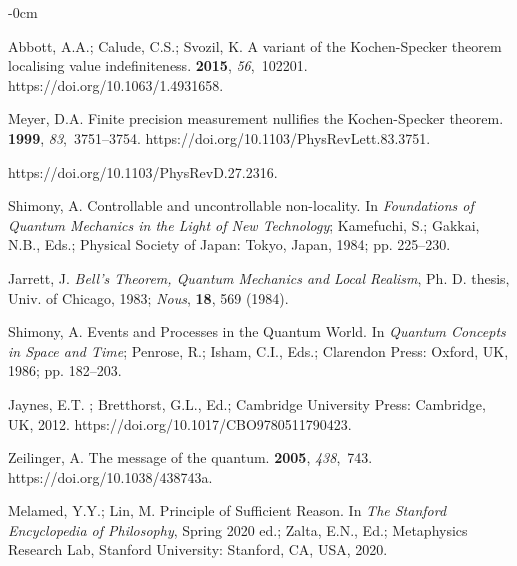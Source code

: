 \documentclass[entropy,article,accept,oneauthor,pdftex]{Definitions/mdpi}
\begin{document}
\begin{adjustwidth}{-\extralength}{0cm}
\begin{thebibliography}{999}
Abbott, A.A.; Calude, C.S.; Svozil, K.
\newblock A variant of the {K}ochen-{S}pecker theorem localising value
  indefiniteness.
 {\bf 2015}, {\em
  56},~102201.
\newblock
  {https://doi.org/10.1063/1.4931658}.

Meyer, D.A.
\newblock Finite precision measurement nullifies the {K}ochen-{S}pecker
  theorem.
 {\bf 1999}, {\em 83},~3751--3754.
\newblock
  {https://doi.org/10.1103/PhysRevLett.83.3751}.

\newblock {}
\newblock {}
\newblock
  {https://doi.org/10.1103/PhysRevD.27.2316}.

Shimony, A.
\newblock Controllable and uncontrollable non-locality.
\newblock  In \emph{Foundations of Quantum Mechanics in the Light of New Technology}; Kamefuchi, S.; Gakkai, N.B., Eds.; Physical Society of Japan:
  Tokyo, Japan, 1984; pp. 225--230.


Jarrett, J.
\newblock
 {\sl Bell's Theorem, Quantum Mechanics and Local
  Realism}, Ph. D. thesis, Univ. of Chicago, 1983; {\sl Nous}, {\bf 18}, 569
  (1984).

Shimony, A.
\newblock Events and Processes in the Quantum World. In {\em Quantum Concepts
  in Space and Time}; Penrose, R.; Isham, C.I., Eds.; Clarendon Press: Oxford, UK,
  1986; pp. 182--203.

Jaynes, E.T.
; Bretthorst, G.L., Ed.; Cambridge
  University Press: Cambridge, UK,  2012.
\newblock
  {https://doi.org/10.1017/CBO9780511790423}.

Zeilinger, A.
\newblock The message of the quantum.
 {\bf 2005}, {\em 438},~743.
\newblock
  {https://doi.org/10.1038/438743a}.

Melamed, Y.Y.; Lin, M.
\newblock Principle of Sufficient Reason. In {\em The Stanford Encyclopedia
  of Philosophy}, Spring 2020 ed.;  Zalta, E.N., Ed.; Metaphysics Research Lab,
  Stanford University: Stanford, CA, USA,
   2020.


\end{thebibliography}
\end{adjustwidth}
\end{document}
